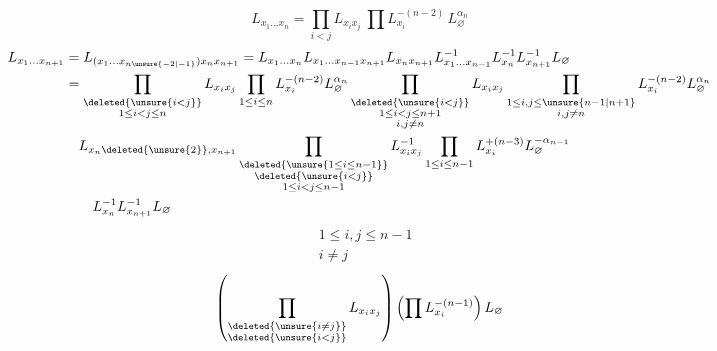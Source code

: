 \[
L_{x_1\ldots x_n}=\prod_{i<j}L_{x_i x_j}\ \prod L_{x_i}^{-(n-2)}\,L_{\varnothing}^{\alpha_n}
\]
\[
\begin{aligned}
L_{x_1\ldots x_{n+1}}&=L_{(x_1\ldots x_{n\unsure{-2|-1}})x_n x_{n+1}}=
 L_{x_1\ldots x_n}L_{x_1\ldots x_{n-1}x_{n+1}}L_{x_nx_{n+1}}
 L_{x_1\ldots x_{n-1}}^{-1}L_{x_n}^{-1}L_{x_{n+1}}^{-1}L_{\varnothing}\\
 &=\prod_{\substack{\deleted{\unsure{i<j}}\\1\le i<j\le n}}L_{x_i x_j}
 \prod_{1\le i\le n}L_{x_i}^{-(n-2)}L_{\varnothing}^{\alpha_n}
 \prod_{\substack{\deleted{\unsure{i<j}}\\1\le i<j\le n+1\\i,j\ne n}}L_{x_i x_j}
 \prod_{\substack{1\le i,j\le\unsure{n-1|n+1}\\i,j\ne n}}L_{x_i}^{-(n-2)}L_{\varnothing}^{\alpha_n}\\
 &\quad L_{x_n\deleted{\unsure{2}},x_{n+1}}
 \prod_{\substack{\deleted{\unsure{1\le i\le n-1}}\\\deleted{\unsure{i<j}}\\1\le i<j\le n-1}}L_{x_ix_j}^{-1}
 \prod_{1\le i\le n-1}L_{x_i}^{+(n-3)}L_{\varnothing}^{-\alpha_{n-1}}\\
 &\qquad L_{x_n}^{-1}L_{x_{n+1}}^{-1}L_{\varnothing}
\end{aligned}
\]
\[
\begin{aligned}
&1\le i,j\le n-1\\
&i\ne j
\end{aligned}
\]
\[
\left(\prod_{\substack{\deleted{\unsure{i\ne j}}\\\deleted{\unsure{i<j}}}}L_{x_ix_j}\right)
\left(\prod L_{x_i}^{-(n-1)}\right)L_{\varnothing}
\]
